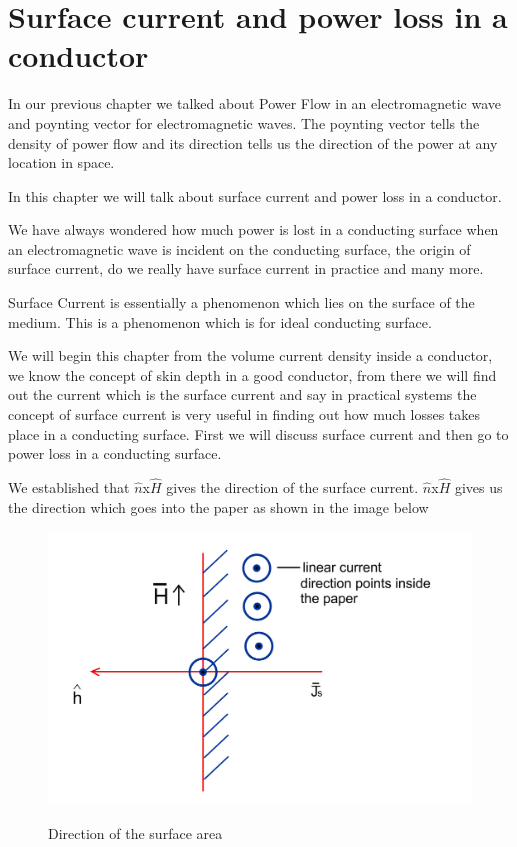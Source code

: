 \chapter{Surface current and power loss in a conductor}\label{lec:lec28}
In our previous chapter we talked about Power Flow in an electromagnetic wave and poynting vector for electromagnetic waves. The poynting vector tells the density of power flow and its direction tells us the direction of the power at any location in space.

In this chapter we will talk about surface current and power loss in a conductor.

We have always wondered how much power is lost in a conducting surface when an electromagnetic wave is incident on the conducting surface, the origin of surface current, do we really have surface current in practice and many more.

Surface Current is essentially a phenomenon which lies on the surface of the medium. This is a phenomenon which is for ideal conducting surface.

We will begin this chapter from the volume current density inside a conductor, we know the concept of skin depth in a good conductor, from there we will find out the current which is the surface current and say in practical systems the concept of surface current is very useful in finding out how much losses takes place in a conducting surface. First we will discuss surface current and then go to power loss in a conducting surface.

We established that $\hat{n}$x$\hat{H}$ gives the direction of the surface current. $\hat{n}$x$\hat{H}$ gives us the direction which goes into the paper as shown in the image below
\begin{figure}[h]
\centering
\textsc{\includegraphics[width=.7\linewidth]{./graphics/Bello281}}
\caption{Direction of the surface area }
\end{figure}

